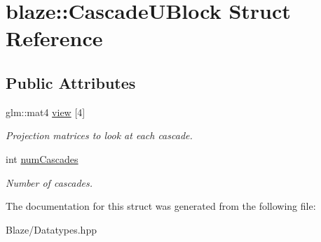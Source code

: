 \hypertarget{structblaze_1_1CascadeUBlock}{}\section{blaze\+:\+:Cascade\+U\+Block Struct Reference}
\label{structblaze_1_1CascadeUBlock}
\subsection*{Public Attributes}
\begin{DoxyCompactItemize}
\item 
\mbox{\label{structblaze_1_1CascadeUBlock_a874d47e55c364daacee25cfc448bd28d}} 
glm\+::mat4 \hyperlink{structblaze_1_1CascadeUBlock_a874d47e55c364daacee25cfc448bd28d}{view} \mbox{[}4\mbox{]}
\begin{DoxyCompactList}\small\item\em Projection matrices to look at each cascade. \end{DoxyCompactList}\item 
\mbox{\label{structblaze_1_1CascadeUBlock_ac902813e311d3221ff9f2817a938951a}} 
int \hyperlink{structblaze_1_1CascadeUBlock_ac902813e311d3221ff9f2817a938951a}{num\+Cascades}
\begin{DoxyCompactList}\small\item\em Number of cascades. \end{DoxyCompactList}\end{DoxyCompactItemize}


The documentation for this struct was generated from the following file\+:\begin{DoxyCompactItemize}
\item 
Blaze/Datatypes.\+hpp\end{DoxyCompactItemize}
